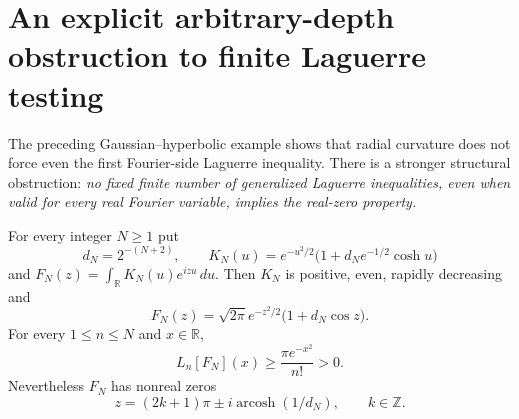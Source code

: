 \section{An explicit arbitrary-depth obstruction to finite Laguerre testing}
\label{sec:finitedepth}
The preceding Gaussian--hyperbolic example
shows that radial curvature does not force even
the first Fourier-side Laguerre inequality.
There is a stronger structural obstruction:
\emph{no fixed finite number of generalized
Laguerre inequalities, even when valid for
every real Fourier variable, implies the
real-zero property.}

\begin{theorem}
\label{thm:finitedepth}
For every integer $N\ge1$ put
\[
d_N=2^{-(N+2)},\qquad
K_N(u)=e^{-u^2/2}
\bigl(1+d_N e^{-1/2}\cosh u\bigr)
\]
and $F_N(z)=\int_{\mathbb R}K_N(u)e^{izu}\,du$.
Then $K_N$ is positive, even, rapidly
decreasing and
\begin{equation}
F_N(z)=\sqrt{2\pi}e^{-z^2/2}
\bigl(1+d_N\cos z\bigr).
\label{eq:finiteF}
\end{equation}
For every $1\le n\le N$ and $x\in\mathbb R$,
\begin{equation}
\boxed{
L_n[F_N](x)\ge
\frac{\pi e^{-x^2}}{n!}>0.
}
\label{eq:finitelb}
\end{equation}
Nevertheless $F_N$ has nonreal zeros
\begin{equation}
z=(2k+1)\pi\pm
i\operatorname{arcosh}(1/d_N),
\qquad k\in\mathbb Z.
\label{eq:finitezero}
\end{equation}
\end{theorem}

